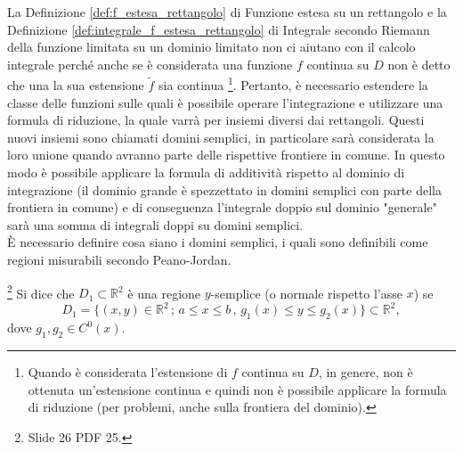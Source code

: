 La Definizione \ref{def:f_estesa_rettangolo} di Funzione estesa su un rettangolo e la Definizione \ref{def:integrale_f_estesa_rettangolo} di Integrale secondo Riemann della funzione limitata su un dominio limitato non ci aiutano con il calcolo integrale perché anche se è considerata una funzione $f$ continua su $D$ non è detto che una la sua estensione $\tilde{f}$ sia continua \footnote{Quando è considerata l'estensione di $f$ continua su $D$, in genere, non è ottenuta un'estensione continua e quindi non è possibile applicare la formula di riduzione (per problemi, anche sulla frontiera del dominio).}.
Pertanto, è necessario estendere la classe delle funzioni sulle quali è possibile operare l'integrazione e utilizzare una formula di riduzione, la quale varrà per insiemi diversi dai rettangoli. Questi nuovi insiemi sono chiamati domini semplici, in particolare sarà considerata la loro unione quando avranno parte delle rispettive frontiere in comune. In questo modo è possibile applicare la formula di additività  rispetto al dominio di integrazione (il dominio grande è spezzettato in domini semplici con parte della frontiera in comune) e di conseguenza l'integrale doppio sul dominio "generale" sarà una somma di integrali doppi su domini semplici.\\
È necessario definire cosa siano i domini semplici, i quali sono definibili come regioni misurabili secondo Peano-Jordan.

\begin{definition}\footnote{Slide 26 PDF 25.}
	Si dice che $D_1\subset\mathbb{R}^2$ è una regione $y$-semplice (o normale rispetto l'asse $x$) se
	\begin{equation*}
		D_1 = \{(x,y)\in\mathbb{R}^2\,;\, a\leq x\leq b\, ,\, g_1(x)\leq y\leq g_2(x)\}\subset\mathbb{R}^2,
	\end{equation*}
	dove $g_1,g_2\in C^0(x)$.
\end{definition}

